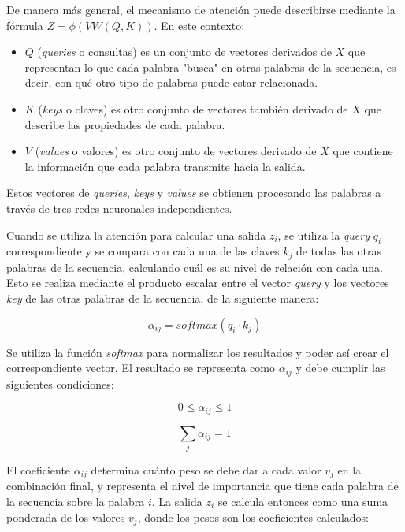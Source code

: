 \documentclass[11pt,spanish,listoffigures,listoftables]{tfgetsinf}
\begin{document}
De manera más general, el mecanismo de atención puede describirse mediante la fórmula $Z = \phi(VW(Q, K))$. En este contexto:

\begin{itemize}
\item $Q$ (\textit{queries} o consultas) es un conjunto de vectores derivados de $X$ que representan lo que cada palabra "busca" en otras palabras de la secuencia, es decir, con qué otro tipo de palabras puede estar relacionada.
\item $K$ (\textit{keys} o claves) es otro conjunto de vectores también derivado de $X$ que describe las propiedades de cada palabra.
\item $V$ (\textit{values} o valores) es otro conjunto de vectores derivado de $X$ que contiene la información que cada palabra transmite hacia la salida.
\end{itemize}

Estos vectores de \textit{queries}, \textit{keys} y \textit{values} se obtienen procesando las palabras a través de tres redes neuronales independientes.

Cuando se utiliza la atención para calcular una salida $z_i$, se utiliza la \textit{query} $q_i$ correspondiente  y se compara con cada una de las claves $k_j$ de todas las otras palabras de la secuencia, calculando cuál es su nivel de relación con cada una. Esto se realiza mediante el producto escalar entre el vector \textit{query} y los vectores \textit{key} de las otras palabras de la secuencia, de la siguiente manera:

\begin{equation}
\alpha_{ij} = softmax(q_i \cdot k_j)
\end{equation}

Se utiliza la función \textit{softmax} para normalizar los resultados y poder así crear el correspondiente vector. El resultado se representa como $\alpha_{ij}$ y debe cumplir las siguientes condiciones:

\begin{equation}
0 \le \alpha_{ij} \le 1
\end{equation}

\begin{equation}
\sum_j\alpha_{ij} = 1
\end{equation}

El coeficiente $\alpha_{ij}$ determina cuánto peso se debe dar a cada valor $v_j$ en la combinación final, y representa el nivel de importancia que tiene cada palabra de la secuencia sobre la palabra $i$. La salida $z_i$ se calcula entonces como una suma ponderada de los valores $v_j$, donde los pesos son los coeficientes calculados:
\end{document}
